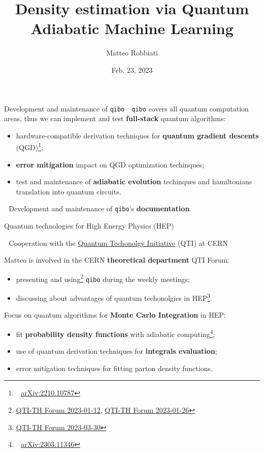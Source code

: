 \documentclass[10pt, xcolor={svgnames}, hyperref={colorlinks,linkcolor=black, citecolor=amethyst, urlcolor=amethyst}]{beamer}
\title{Density estimation via Quantum Adiabatic Machine Learning}
\date{Feb. 23, 2023}
\author[Matteo Robbiati]{Matteo Robbiati}
\begin{document}
\begin{frame}{Development and maintenance of \texttt{qibo}}
\faArrowCircleRight\,\, \texttt{qibo} covers all quantum computation areas, thus 
we can implement and test \textbf{full-stack} quantum algorithms:

\begin{itemize}[noitemsep]
    \item[\faCode]  hardware-compatible derivation techniques 
    for \textbf{quantum gradient descents} (QGD)\footnote{\faBook\,\, 
    \href{https://arxiv.org/abs/2210.10787}{arXiv:2210.10787}};
    \item[\faCode] \textbf{error mitigation} impact on QGD optimization techinques;
    \item[\faCode] test and maintenance of \textbf{adiabatic evolution} techinques and hamiltonians
    translation into quantum circuits.

\end{itemize}

\faArrowCircleRight\,\, Development and maintenance of \texttt{qibo}'s \textbf{documentation}.

\end{frame}


\begin{frame}{Quantum technologies for High Energy Physics (HEP)}

\faArrowCircleRight\,\, Cooperation with the 
\href{https://quantum.cern/}{Quantum Techonolgy Initiative} (QTI) at CERN


\begin{tcolorbox}[colback=red!15, boxrule=1pt, arc=.8em, boxsep=0mm]
Matteo is involved in the CERN \textbf{theoretical department} QTI Forum:
\begin{itemize}[noitemsep]
    \item[\faCode] presenting
    and using\footnote{\href{https://indico.cern.ch/event/1235582/}{QTI-TH Forum 2023-01-12},
    \href{https://indico.cern.ch/event/1235584/}{QTI-TH Forum 2023-01-26}}
    \texttt{qibo} during the weekly meetings;
    \item[\faCode] discussing about advantages of quantum techonolgies in 
    HEP\footnote{\href{https://indico.cern.ch/event/1267029/}{QTI-TH Forum 2023-03-30}}.
\end{itemize}
\end{tcolorbox}

\begin{tcolorbox}[colback=blue!15, boxrule=1pt, arc=.8em, boxsep=0mm]
Focus on quantum algorithms for \textbf{Monte Carlo Integration} in HEP: 
\begin{itemize}[noitemsep]
    \item[\faCode] fit \textbf{probability density functions} with adiabatic
    computing\footnote{\faBook\,\, \href{https://arxiv.org/abs/2303.11346}{arXiv:2303.11346}};
    \item[\faCode] use of quantum derivation techniques for \textbf{integrals evaluation};
    \item[\faCode] error mitigation techniques for fitting parton density functions.
\end{itemize}
\end{tcolorbox}

\end{frame}
\end{document}
